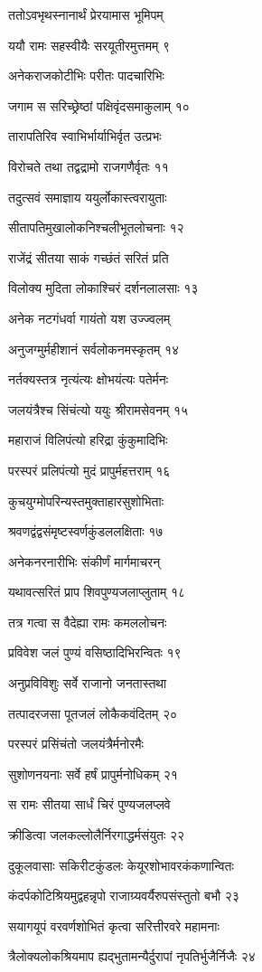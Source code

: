 ततोऽवभृथस्नानार्थं प्रेरयामास भूमिपम्

ययौ रामः सहस्वीयैः सरयूतीरमुत्तमम् ९

अनेकराजकोटीभिः परीतः पादचारिभिः

जगाम स सरिच्छ्रेष्ठां पक्षिवृंदसमाकुलाम् १०

तारापतिरिव स्वाभिर्भार्याभिर्वृत उत्प्रभः

विरोचते तथा तद्वद्रामो राजगणैर्वृतः ११

तदुत्सवं समाज्ञाय ययुर्लोकास्त्वरायुताः

सीतापतिमुखालोकनिश्चलीभूतलोचनाः १२

राजेंद्रं सीतया साकं गच्छंतं सरितं प्रति

विलोक्य मुदिता लोकाश्चिरं दर्शनलालसाः १३

अनेक नटगंधर्वा गायंतो यश उज्ज्वलम्

अनुजग्मुर्महीशानं सर्वलोकनमस्कृतम् १४

नर्तक्यस्तत्र नृत्यंत्यः क्षोभयंत्यः पतेर्मनः

जलयंत्रैश्च सिंचंत्यो ययुः श्रीरामसेवनम् १५

महाराजं विलिपंत्यो हरिद्रा कुंकुमादिभिः

परस्परं प्रलिपंत्यो मुदं प्रापुर्महत्तराम् १६

कुचयुग्मोपरिन्यस्तमुक्ताहारसुशोभिताः

श्रवणद्वंद्वसंमृष्टस्वर्णकुंडललक्षिताः १७

अनेकनरनारीभिः संकीर्णं मार्गमाचरन्

यथावत्सरितं प्राप शिवपुण्यजलाप्लुताम् १८

तत्र गत्वा स वैदेह्या रामः कमललोचनः

प्रविवेश जलं पुण्यं वसिष्ठादिभिरन्वितः १९

अनुप्रविविशुः सर्वे राजानो जनतास्तथा

तत्पादरजसा पूतजलं लोकैकवंदितम् २०

परस्परं प्रसिंचंतो जलयंत्रैर्मनोरमैः

सुशोणनयनाः सर्वे हर्षं प्रापुर्मनोधिकम् २१

स रामः सीतया सार्धं चिरं पुण्यजलप्लवे

क्रीडित्वा जलकल्लोलैर्निरगाद्धर्मसंयुतः २२

दुकूलवासाः सकिरीटकुंडलः केयूरशोभावरकंकणान्वितः

कंदर्पकोटिश्रियमुद्वहन्नृपो राजाग्र्यवर्यैरुपसंस्तुतो बभौ २३

सयागयूपं वरवर्णशोभितं कृत्वा सरित्तीरवरे महामनाः

त्रैलोक्यलोकश्रियमाप ह्यद्भुतामन्यैर्दुरापां नृपतिर्भुजैर्निजैः २४

